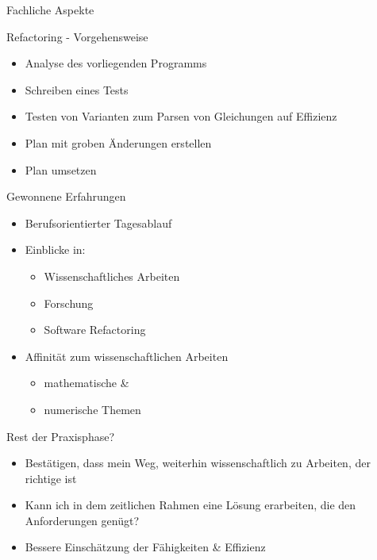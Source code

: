 \documentclass{beamer}           %
\begin{document}
\begin{frame}{Fachliche Aspekte}
	\begin{block}{Refactoring - Vorgehensweise}
		\begin{itemize}
			\item Analyse des vorliegenden Programms
			\pause
			\item Schreiben eines Tests
			\pause
			\item Testen von Varianten zum Parsen von Gleichungen auf Effizienz
			\pause
			\item Plan mit groben Änderungen erstellen
			\pause
			\item \alert{Plan umsetzen}
		\end{itemize}
	\end{block}	
\end{frame}

\begin{frame}{Gewonnene Erfahrungen}
	\begin{itemize}
		\item Berufsorientierter Tagesablauf
		\pause
		\item Einblicke in:
		\begin{itemize}
			\item Wissenschaftliches Arbeiten
			\item Forschung
			\item Software Refactoring
		\end{itemize}
		\pause
		\item Affinität zum wissenschaftlichen Arbeiten
		\begin{itemize}
			\item mathematische \&
			\item numerische Themen
		\end{itemize}
	\end{itemize}
\end{frame}

\begin{frame}{Rest der Praxisphase?}
	\begin{itemize}
		\item Bestätigen, dass mein Weg, weiterhin wissenschaftlich zu Arbeiten, der richtige ist
		\pause
		\item Kann ich in dem zeitlichen Rahmen eine Lösung erarbeiten, die den Anforderungen genügt?
		\pause
		\item Bessere Einschätzung der Fähigkeiten \& Effizienz
	\end{itemize}
\end{frame}
\end{document}
